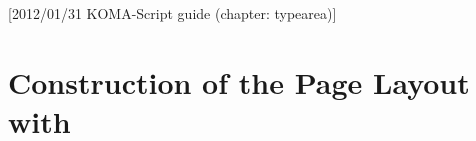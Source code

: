 %
%
%
%
%
%
%
%
% 
%
%
%
%

[2012/01/31 KOMA-Script guide (chapter: typearea)]


\chapter{Construction of the Page Layout with }

%
%

